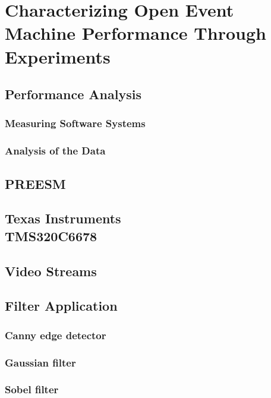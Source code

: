 \chapter [Experiments] {Characterizing Open Event Machine Performance Through Experiments}
\label{chapter:experiments}


\section{Performance Analysis}
\label{sec:performance-analysis}


\subsection{Measuring Software Systems}
\label{subsec:measuring-software}


\subsection{Analysis of the Data}
\label{subsec:data-analysis}


\section{PREESM}
\label{sec:preesm}


\section[Texas Instruments TMS320C6678]{Texas Instruments\\TMS320C6678}
\label{sec:c6678}


\section{Video Streams}

\section{Filter Application}
\label{sec:filterapp}


\subsection{Canny edge detector}
\label{subsec:canny}


\subsection{Gaussian filter}
\label{subsec:gauss}


\subsection{Sobel filter}
\label{subsec:sobel}

